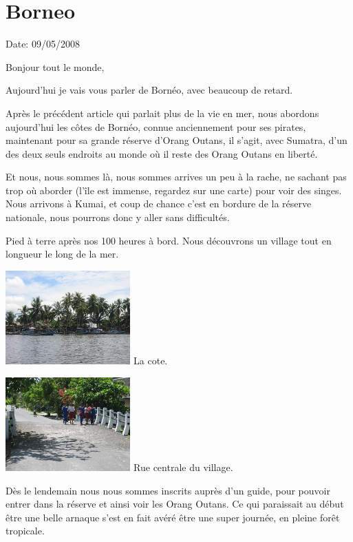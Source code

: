 \section{Borneo}

Date: 09/05/2008

\begin{multicols}{2}

Bonjour tout le monde,

Aujourd'hui je vais vous parler de Bornéo, avec beaucoup de retard.

Après le précédent article qui parlait plus de la vie en mer, nous abordons aujourd'hui les côtes de Bornéo, connue anciennement pour ses pirates, maintenant pour sa grande réserve d'Orang Outans, il s'agit, avec Sumatra, d'un des deux seuls endroits au monde où il reste des Orang Outans en liberté.

Et nous, nous sommes là, nous sommes arrives un peu à la rache, ne sachant pas trop où aborder (l'île est immense, regardez sur une carte) pour voir des singes. Nous arrivons à Kumai, et coup de chance c'est en bordure de la réserve nationale, nous pourrons donc y aller sans difficultés.

Pied à terre après nos 100 heures à bord. Nous découvrons un village tout en longueur le long de la mer.

\hspace*{-0.65cm}
\includegraphics[width=4.8cm]{articles/Borneo/1210331303F4qq.jpg}
La cote.

\hspace*{-0.65cm}
\includegraphics[width=4.8cm]{articles/Borneo/1210331297ISJ9.jpg}
Rue centrale du village.

Dès le lendemain nous nous sommes inscrits auprès d'un guide, pour pouvoir entrer dans la réserve et ainsi voir les Orang Outans. Ce qui paraissait au début être une belle arnaque s'est en fait avéré être une super journée, en pleine forêt tropicale.


\end{multicols}
